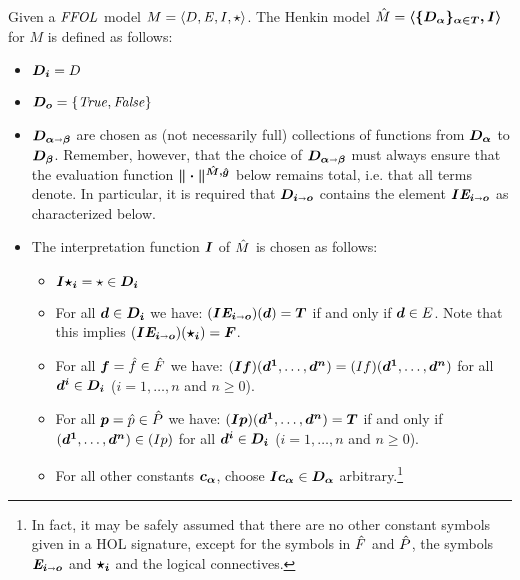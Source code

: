 \begin{definition}\label{def:hm}
Given a $\mathit{FFOL}$ model $M = \langle D, \mathit{E}, I, \star\rangle$. The Henkin
model $\hat{M} = \boldsymbol{\langle \{D_\alpha\}_{\alpha \in {T}},I \rangle}$ for
$M$ is defined as follows: 
\begin{itemize}
\item $\boldsymbol{D_i} = D$
\item $\boldsymbol{D_o} = \{\mathit{True},\mathit{False}\}$
\item $\boldsymbol{D_{\alpha\shortrightarrow\beta}}$ are
chosen as (not necessarily full) collections of functions from
$\boldsymbol{D_\alpha}$ to $\boldsymbol{D_\beta}$. Remember, however, that the
choice of $\boldsymbol{D_{\alpha\shortrightarrow\beta}}$ must always ensure that 
the evaluation function 
 $\boldsymbol{\|\cdot\|^{\hat{M},\hat{g}}}$ below remains total, i.e. that
 all terms denote. In particular, it is required that $\boldsymbol{D_{i\shortrightarrow
     o}}$ contains the element $\boldsymbol{I \mathit{E}_{i\shortrightarrow
     o}}$ as characterized below.
\item The interpretation function $\boldsymbol{I}$ of $\hat{M}$
  is chosen as follows:
\begin{itemize}
\item  $\boldsymbol{I \star_i} = \star \in \boldsymbol{D_i}$
\item  For all
    $\boldsymbol{d} \in \boldsymbol{D_i}$ we have: $(\boldsymbol{I \mathit{E}_{i\shortrightarrow o}})(\boldsymbol{d}) =
    \boldsymbol{T}$  if and only if $\boldsymbol{d} \in E$. Note that this implies $(\boldsymbol{I \mathit{E}_{i\shortrightarrow o}})(\boldsymbol{\star_i}) = \boldsymbol{F}$.
\item \sloppy For all $\boldsymbol{f} = \hat{f} \in \hat{F}$ we
       have: $(\boldsymbol{I} \boldsymbol{f})(\boldsymbol{d^1},\ldots,\boldsymbol{d^n}) = (I f)(\boldsymbol{d^1},\ldots,\boldsymbol{d^n})$ for
       all $\boldsymbol{d^i}\in \boldsymbol{D_i}$ ($i=1,\ldots,n$ and
       $n\geq 0$).
\item \sloppy For all $\boldsymbol{p} = \hat{p} \in \hat{P}$ we
       have: $(\boldsymbol{I} \boldsymbol{p})(\boldsymbol{d^1},\ldots,\boldsymbol{d^n}) = \boldsymbol{T}$
       if and only if $(\boldsymbol{d^1},\ldots,\boldsymbol{d^n}) \in (I p)$ for
       all $\boldsymbol{d^i}\in \boldsymbol{D_i}$ ($i=1,\ldots,n$ and
       $n\geq 0$).
\item For all other constants $\boldsymbol{c_\alpha}$, choose $\boldsymbol{I
    c_\alpha} \in \boldsymbol{D_\alpha}$ arbitrary.\footnote{In fact, it may be safely assumed that there are
  no other constant symbols given in a HOL signature, except for the symbols in
  $\hat{F}$ and $\hat{P}$, the symbols $\boldsymbol{\mathit{E}_{i\shortrightarrow o}}$  and $\boldsymbol{\star_{i}}$ and the logical connectives.}
\end{itemize}
\end{itemize}


\end{definition}
